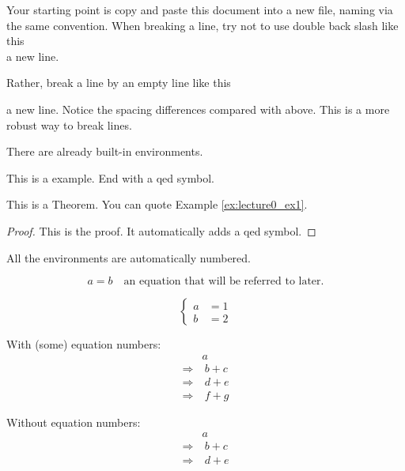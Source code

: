 Your starting point is copy and paste this document into a new file, naming via the same convention. When breaking a line, try not to use double back slash like this\\
a new line.

Rather, break a line by an empty line like this

a new line. Notice the spacing differences compared with above. This is a more robust way to break lines.

There are already built-in environments.
\begin{example}     \label{ex:lecture0_ex1}
    This is a example. End with a qed symbol. \hfill \qedsymbol
\end{example}

\begin{theorem}     \label{thm:lecture0_thm1}
    This is a Theorem. You can quote Example \ref{ex:lecture0_ex1}.
\end{theorem}
\begin{proof}
    This is the proof. It automatically adds a qed symbol.
\end{proof}

\begin{remark}
    All the environments are automatically numbered.
\end{remark}

\begin{equation}    \label{eq:lecture0_eq1}
    a = b \quad \text{an equation that will be referred to later.}
\end{equation}

\[
    \begin{cases}
        a & = 1     \\
        b & = 2
    \end{cases}
\]

With (some) equation numbers:
\begin{align}
    & a     \\
    \Longrightarrow & \  b + c      \nonumber \\
    \Longrightarrow & \  d + e  \\[3mm]
    \Longrightarrow & \  f + g
\end{align}

Without equation numbers:
\begin{align*}
    & a     \\
    \Longrightarrow & \  b + c \\
    \Longrightarrow & \  d + e
\end{align*}

